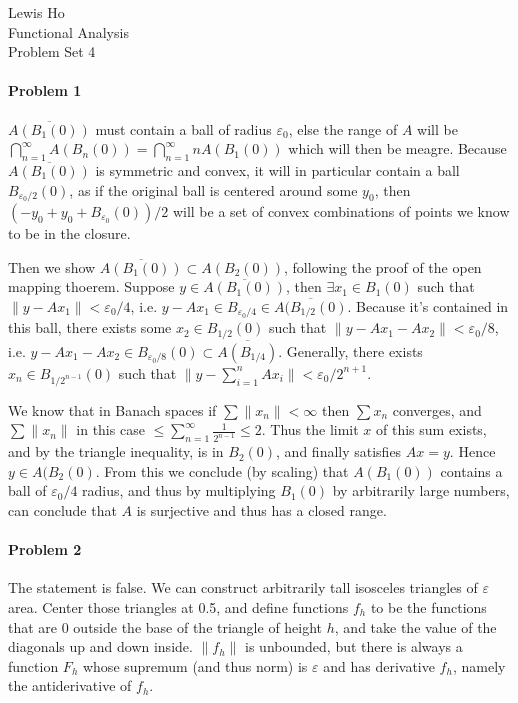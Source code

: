 \documentclass[12pt]{article}
\begin{document}
\begin{center}
  Lewis Ho\\
  Functional Analysis\\
  Problem Set 4
\end{center}

\paragraph{Problem 1}

$\overline{A(B_1(0))}$ must contain a ball of radius $\varepsilon_0$, else the
range of $A$ will be
$\bigcap_{n=1}^\infty A(B_n(0)) = \bigcap_{n=1}^\infty nA(B_1(0))$ which will
then be meagre. Because $\overline{A(B_1(0))}$ is symmetric and convex, it will
in particular contain a ball $B_{\varepsilon_0/2}(0)$, as if the original ball is
centered around some $y_0$, then $(-y_0 + y_0 + B_{\varepsilon_0}(0))/2$ will be
a set of convex combinations of points we know to be in the closure.

Then we show $\overline{A(B_1(0))}\subset A(B_2(0))$, following the proof of the
open mapping thoerem. Suppose $y \in \overline{A(B_1(0))}$, then $\exists x_1\in
B_1(0)$ such that $\|y-Ax_1\| < \varepsilon_0/4$, i.e. $y-Ax_1 \in B_{\varepsilon_0
  /4}\in\overline{A(B_{1/2}(0)}$. Because it's contained in this ball, there exists
some $x_2 \in B_{1/2}(0)$ such that $\|y-Ax_1-Ax_2\|<\varepsilon_0/8$, i.e.
$y - Ax_1 - Ax_2 \in B_ {\varepsilon_0/8}(0) \subset \overline{A(B_{1/4})}$.
Generally, there exists $x_n \in B_{1/2^{n-1}}(0)$ such that $\|y-\sum_{i=1}^nAx_i\|
< \varepsilon_0/2^{n+1}$.

We know that in Banach spaces if $\sum\|x_n\|<\infty$ then $\sum x_n$ converges,
and $\sum\|x_n\|$ in this case $ \leq \sum_{n=1}^\infty \frac{1}{2^{n-1}} \leq 2$.
Thus the limit $x$ of this sum exists, and by the triangle inequality, is in
$B_2(0)$, and finally satisfies $Ax = y$. Hence $y \in A(B_2(0)$. From this we
conclude (by scaling) that $A(B_1(0))$ contains a ball of $\varepsilon_0/4$ radius,
and thus by multiplying $B_1(0)$ by arbitrarily large numbers, can conclude that
$A$ is surjective and thus has a closed range.

\paragraph{Problem 2}

The statement is false. We can construct arbitrarily tall isosceles triangles of
$\varepsilon$ area. Center those triangles at 0.5, and define functions $f_
h$ to be the functions that are 0 outside the base of the triangle of height $h$,
and take the value of the diagonals up and down inside. $\|f_h\|$ is
unbounded, but there is always a function $F_h$ whose supremum (and thus norm) is
$\varepsilon$ and has derivative $f_h$, namely the antiderivative of $f_h$.
\end{document}
